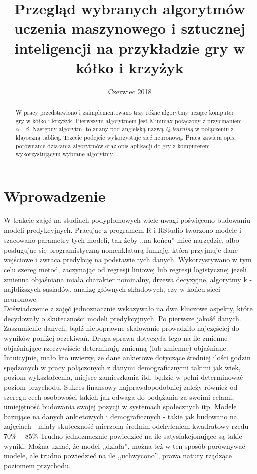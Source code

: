 \documentclass[licencjacka]{pracamgr}
\title{Przegląd wybranych algorytmów uczenia maszynowego i sztucznej inteligencji na przykładzie gry w kółko i krzyżyk}
\date{Czerwiec 2018}
\begin{document}
\maketitle
\begin{abstract}
  W pracy przedstawiono i zaimplementowano trzy różne algorytmy uczące komputer gry w kółko i krzyżyk. Pierwszym algorytmem jest Minimax połączony z przycinaniem $\alpha$ - $\beta$. Następny algorytm, to znany pod angielską nazwą \textit{Q-learning} w połączeniu z  klaysczną tablicą. Trzecie podejcie wykorzystuje sieć neuronową. Praca zawiera opis, porównanie działania algorytmów oraz opis aplikacji do gry z komputerem wykorzystującym wybrane algorytmy.
\end{abstract}

\tableofcontents


\chapter*{Wprowadzenie}

W trakcie zajęć na studiach podyplomowych wiele uwagi poświęcono budowaniu modeli predykcyjnych. Pracując z  programem R  i RStudio tworzono modele i szacowano parametry tych modeli, tak żeby ,,na końcu'' mieć narzędzie, albo posługując się programistyczną nomenklaturą funkcję, która przyjmuje dane wejściowe i zwraca predykcję na podstawie tych danych. Wykorzystywano w tym celu szereg metod, zaczynając od regresji liniowej lub regresji logistycznej jeżeli zmienna objaśniana miała charakter nominalny, drzewa decyzyjne,  algorytmy k - najbliższych sąsiadów, analizę głównych składowych, czy w końcu sieci neuronowe.  \\

Doświadczenie z zajęć jednoznacznie wskazywało na dwa kluczowe aspekty, które decydowały o skuteczności modeli predykcyjnych. Po pierwsze jakość danych. Zaszumienie danych, bądź niepoprawne skalowanie prowadziło najczęściej do wyników poniżej oczekiwań. Druga sprawa dotyczyła tego na ile zmienne objaśniające rzeczywiście determinują zmienną (lub zmienne) objaśniane. Intuicyjnie, mało kto uwierzy, że dane ankietowe dotyczące średniej ilości godzin spędzonych w pracy połączonych z danymi demograficznymi takimi jak wiek, poziom wykształcenia, miejsce zamieszkania itd. będzie w pełni determinować poziom przychodu. Sukces finansowy najprawdopodobniej zależy również od szeregu cech osobowości takich jak odwaga do podążania za swoimi celami, umiejętność budowania swojej pozycji w systemach społecznych itp.  Modele bazujące na danych ankietowych i demograficznych - takie jak budowano na zajęciach - miały skuteczność mierzoną średnim odchyleniem kwadratowy rzędu $70\% - 85\%$  Trudno jednoznacznie powiedzieć na ile satysfakcjonujące są takie wyniki. Można uznać, że model ,,działa'', można też w ten sposób porównywać modele, ale trudno powiedzieć na ile ,,uchwycono'',  prawa natury rządzące poziomem przychodu.\\
 
\end{document}
